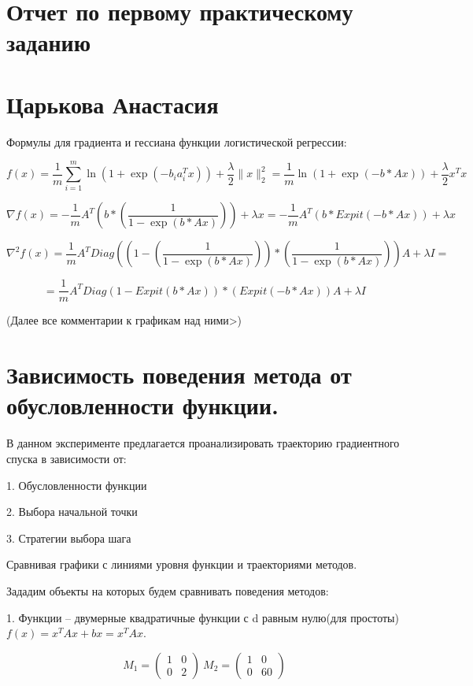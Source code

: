 \documentclass{article}
\theoremstyle{definition}
\theoremstyle{remark}
\newcommand{\lfrac} [2] {\displaystyle \frac{#1}{#2}}
\begin{document}
\section*{Отчет по первому практическому заданию}
\section*{Царькова Анастасия}

Формулы для градиента и гессиана функции логистической регрессии:

$$
f(x) = \lfrac{1}{m} \sum_{i = 1}^m \ln(1 + \exp(-b_ia_i^Tx)) + \lfrac{\lambda}{2} \|x\|_2^2 = \lfrac{1}{m} \ln(1 + \exp(-b * Ax)) + \lfrac{\lambda}{2} x^Tx
$$

$$
\nabla f(x) = -\lfrac{1}{m} A^T \left(b * \left(\lfrac{1}{1 - \exp(b * Ax)} \right)\right) + \lambda x = -\lfrac{1}{m} A^T \left(b * Expit(-b * Ax)\right) + \lambda x
$$

$$
\nabla^2 f(x) = \lfrac{1}{m} A^T Diag\left(\left(1 - \left(\lfrac{1}{1 - \exp(b * Ax)} \right)\right) * \left(\lfrac{1}{1 - \exp(b * Ax)} \right)\right)A + \lambda I =
$$

$$
= \lfrac{1}{m} A^T Diag\left(1 - Expit(b * Ax)\right) * \left(Expit(-b * Ax)\right)A + \lambda I
$$


(Далее все комментарии к графикам над ними>)

\section{Зависимость поведения метода от обусловленности функции.}


В данном эксперименте предлагается проанализировать траекторию градиентного спуска в зависимости от:

1. Обусловленности функции

2. Выбора начальной точки

3. Стратегии выбора шага



Сравнивая графики с линиями уровня функции и траекториями методов.



Зададим объекты на которых будем сравнивать поведения методов:

1. Функции --  двумерные квадратичные функции с d равным нулю(для простоты) $f(x) = x^TAx + bx = x^TAx$.

$$
M_1 =
\begin{pmatrix}
1 &	0\\
0 &	2
\end{pmatrix}\ M_2 =
\begin{pmatrix}
1 &	0\\
0 &	60
\end{pmatrix}
$$
\end{document}
